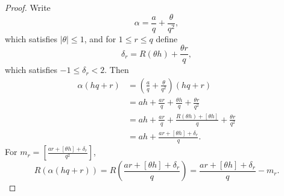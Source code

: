 \documentclass{article}
\begin{document}
\begin{proof}
Write
\[
\alpha = \frac{a}{q}+\frac{\theta}{q^2},
\]
which satisfies $|\theta| \leq 1$, and for $1 \leq r \leq q$ define
\[
\delta_r = R(\theta h)+\frac{\theta r}{q},
\]
which satisfies $-1 \leq \delta_r < 2$. Then
\begin{align*}
\alpha(hq+r)&= \left(\frac{a}{q}+\frac{\theta}{q^2}\right)(hq+r)\\
&=ah+\frac{ar}{q}+\frac{\theta h}{q}+\frac{\theta r}{q^2}\\
&=ah+\frac{ar}{q} + \frac{R(\theta h)+[\theta h]}{q}+\frac{\theta r}{q^2}\\
&=ah+\frac{ar+[\theta h]+\delta_r}{q}.
\end{align*}
For $m_r = \left[ \frac{ar+[\theta h]+\delta_r}{q^2} \right]$, 
\[
R(\alpha(hq+r)) = R\left( \frac{ar+[\theta h]+\delta_r}{q}\right) = \frac{ar+[\theta h]+\delta_r}{q} - m_r.
\]


\end{proof}
\end{document}
